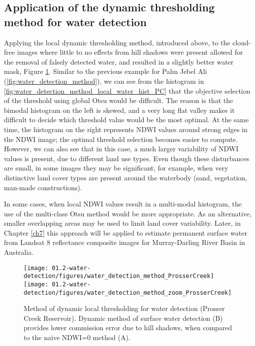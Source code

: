 \subsection{Application of the dynamic thresholding method for water detection}

Applying the local dynamic thresholding method, introduced above, to the cloud-free images where little to no effects from hill shadows were present allowed for the removal of falsely detected water, and resulted in a slightly better water mask, Figure \ref{fig:water_detection_method_PC}. Similar to the previous example for Palm Jebel Ali (\ref{fig:water_detection_method}), we can see from the histogram in \ref{fig:water_detection_method_local_water_hist_PC} that the objective selection of the threshold using global Otsu would be difficult. The reason is that the bimodal histogram on the left is skewed, and a very long flat valley makes it difficult to decide which threshold value would be the most optimal. At the same time, the histogram on the right represents \gls{NDWI} values around strong edges in the \gls{NDWI} image; the optimal threshold selection becomes easier to compute. However, we can also see that in this case, a much larger variability of \gls{NDWI} values is present, due to different land use types. Even though these disturbances are small, in some images they may be significant, for example, when very distinctive land cover types are present around the waterbody (sand, vegetation, man-made constructions). 

In some cases, when local \gls{NDWI} values result in a multi-modal histogram, the use of the multi-class Otsu method would be more appropriate. As an alternative, smaller overlapping areas may be used to limit land cover variability. Later, in Chapter \ref{ch7} this approach will be applied to estimate permanent surface water from Landsat 8 reflectance composite images for Murray-Darling River Basin in Australia. 

\begin{figure}[H]
	\centering
	\texttt{[image: 01.2-water-detection/figures/water\_detection\_method\_ProsserCreek]}
	\texttt{[image: 01.2-water-detection/figures/water\_detection\_method\_zoom\_ProsserCreek]}
	\caption{Method of dynamic local thresholding for water detection (Prosser Creek Reservoir). Dynamic method of surface water detection (B) provides lower commission error due to hill shadows, when compared to the naive NDWI=0 method (A). }
	\label{fig:water_detection_method_PC}
\end{figure}

